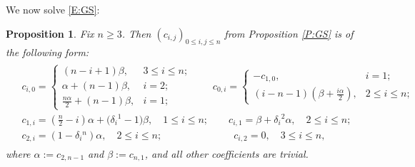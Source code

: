 \documentclass[pdftex]{sigma}%
\numberwithin{equation}{section}
\newtheorem{Proposition}[Theorem]{Proposition}
 { \theoremstyle{definition}
\newtheorem{Definition}[Theorem]{Definition}
\newtheorem{Note}[Theorem]{Note}
\newtheorem{Example}[Theorem]{Example}
\newtheorem{Remark}[Theorem]{Remark} }
\begin{document}
We now solve \eqref{E:GS}:
\begin{Proposition}\label{P:sol}
Fix $n \ge 3$. Then $(c_{i,j})_{0 \leq i,j \leq n}$ from Proposition {\rm \ref{P:GS}} is of the following form:
\begin{align} \label{E:sol}
\begin{split}
&c_{i,0}=\begin{cases}
(n-i+1)\beta, & 3 \le i \le n;\\
\alpha + (n-1)\beta, & i = 2;\\
\frac{n \alpha}{2} + (n-1)\beta, & i = 1;
\end{cases} \qquad
c_{0,i}=\begin{cases}
-c_{1,0}, & i =1; \\
(i-n-1)(\beta + \frac{i\alpha}{2}), & 2 \le i \le n;
\end{cases}\\
&c_{1,i}= \left(\frac{n}{2}-i\right)\alpha + \bigl(\delta_i{}^1-1\bigr)\beta, \quad 1 \le i \le n; \qquad c_{i,1} = \beta + \delta_i{}^2 \alpha, \quad 2 \le i \le n;\\
&c_{2,i} = (1-\delta_i{}^n)\alpha, \quad 2 \le i \le n; \hspace{3cm} c_{i,2}= 0, \quad 3 \le i \le n,
\end{split}
\end{align}
where $\alpha :=c_{2,n-1}$ and $\beta := c_{n,1}$, and all other coefficients are trivial.
\end{Proposition}
\end{document}
